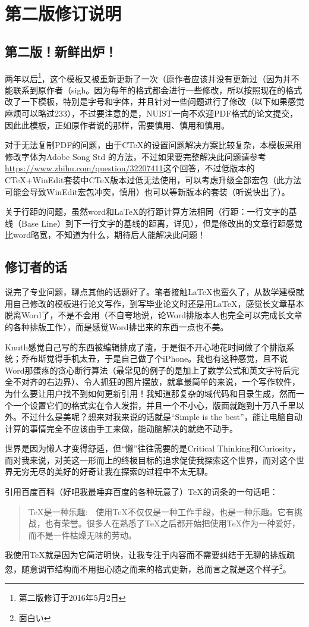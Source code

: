 \section{第二版修订说明}
\subsection{第二版！新鲜出炉！}
两年以后\footnote{第二版修订于2016年5月2日}，这个模板又被重新更新了一次（原作者应该并没有更新过（因为并不能联系到原作者（sigh。因为每年的格式都会进行一些修改，所以按照现在的格式改了一下模板，特别是字号和字体，并且针对一些问题进行了修改（以下如果感觉麻烦可以略过233），不过要注意的是，NUIST一向不欢迎PDF格式的论文提交，因此此模板，正如原作者说的那样，需要慎用、慎用和慎用。\par
对于无法复制PDF的问题，由于CTeX的设置问题解决方案比较复杂，本模板采用修改字体为Adobe Song Std 的方法，不过如果要完整解决此问题请参考\url{https://www.zhihu.com/question/32207411}这个回答，不过低版本的CTeX+WinEdit套装中CTeX版本过低无法使用，可以考虑升级全部宏包（此方法可能会导致WinEdit宏包冲突，慎用）也可以等新版本的套装（听说快出了）。\par
关于行距的问题，虽然word和LaTeX的行距计算方法相同（行距：一行文字的基线（Base Line）到下一行文字的基线的距离，详见\cite{x4}），但是修改出的文章行距感觉比word略宽，不知道为什么，期待后人能解决此问题！\par
\subsection{修订者的话}
说完了专业问题，聊点其他的话题好了。笔者接触LaTeX也蛮久了，从数学建模就用自己修改的模板进行论文写作，到写毕业论文时还是用LaTeX，感觉长文章基本脱离Word了，不是不会用（不自夸地说，论Word排版本人也完全可以完成长文章的各种排版工作），而是感觉Word排出来的东西一点也不美。\par
Knuth感觉自己写的东西被编辑排成了渣，于是很不开心地花时间做了个排版系统；乔布斯觉得手机太丑，于是自己做了个iPhone。我也有这种感觉，且不说Word那蛋疼的贪心断行算法（最常见的例子的是加上了数学公式和英文字符后完全不对齐的右边界）、令人抓狂的图片摆放，就拿最简单的来说，一个写作软件，为什么要让用户找不到如何更新引用！我知道那复杂的域代码和目录生成，然而一个一个设置它们的格式实在令人发指，并且一个不小心，版面就跑到十万八千里以外。不过什么是美呢？想来对我来说的话就是“Simple is the best”，能让电脑自动计算的事情完全不应该由手工来做，能动脑解决的就绝不动手。\par
世界是因为懒人才变得舒适，但“懒”往往需要的是Critical Thinking和Curiosity，而对我来说，对美这一形而上的终极目标的追求促使我探索这个世界，而对这个世界无穷无尽的美好的好奇让我在探索的过程中不太无聊。\par
引用百度百科（好吧我最唾弃百度的各种玩意了）TeX的词条的一句话吧：
\begin{quote}
  TeX是一种乐趣:　使用TeX不仅仅是一种工作手段，也是一种乐趣。它有挑战，也有荣誉。很多人在熟悉了TeX之后都开始把使用TeX作为一种爱好，而不是一件枯燥无味的劳动。
\end{quote}
我使用TeX就是因为它简洁明快，让我专注于内容而不需要纠结于无聊的排版疏忽，随意调节结构而不用担心随之而来的格式更新，总而言之就是这个样子\footnote{面白い}。\par